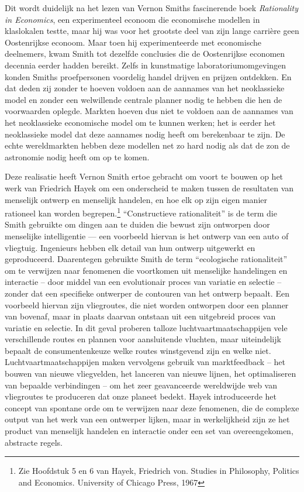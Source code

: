 Dit wordt duidelijk na het lezen van Vernon Smith\textquotesingle s fascinerende boek \emph{Rationality in Economics}, een experimenteel econoom die economische modellen in klaslokalen testte, maar hij was voor het grootste deel van zijn lange carrière geen Oostenrijkse econoom.\autocite{192} Maar toen hij experimenteerde met economische deelnemers, kwam Smith tot dezelfde conclusies die de Oostenrijkse economen decennia eerder hadden bereikt. Zelfs in kunstmatige laboratoriumomgevingen konden Smith\textquotesingle s proefpersonen voordelig handel drijven en prijzen ontdekken. En dat deden zij zonder te hoeven voldoen aan de aannames van het neoklassieke model en zonder een welwillende centrale planner nodig te hebben die hen de voorwaarden oplegde. Markten hoeven dus niet te voldoen aan de aannames van het neoklassieke economische model om te kunnen werken; het is eerder het neoklassieke model dat deze aannames nodig heeft om berekenbaar te zijn. De echte wereldmarkten hebben deze modellen net zo hard nodig als dat de zon de astronomie nodig heeft om op te komen.

Deze realisatie heeft Vernon Smith ertoe gebracht om voort te bouwen op het werk van Friedrich Hayek om een onderscheid te maken tussen de resultaten van menselijk ontwerp en menselijk handelen, en hoe elk op zijn eigen manier rationeel kan worden begrepen.\footnote{Zie Hoofdstuk 5 en 6 van Hayek, Friedrich von. Studies in Philosophy, Politics and Economics. University of Chicago Press, 1967} ``Constructieve rationaliteit'' is de term die Smith gebruikte om dingen aan te duiden die bewust zijn ontworpen door menselijke intelligentie --- een voorbeeld hiervan is het ontwerp van een auto of vliegtuig. Ingenieurs hebben elk detail van hun ontwerp uitgewerkt en geproduceerd. Daarentegen gebruikte Smith de term ``ecologische rationaliteit'' om te verwijzen naar fenomenen die voortkomen uit menselijke handelingen en interactie -- door middel van een evolutionair proces van variatie en selectie -- zonder dat een specifieke ontwerper de contouren van het ontwerp bepaalt. Een voorbeeld hiervan zijn vliegroutes, die niet worden ontworpen door een planner van bovenaf, maar in plaats daarvan ontstaan uit een uitgebreid proces van variatie en selectie. In dit geval proberen talloze luchtvaartmaatschappijen vele verschillende routes en plannen voor aansluitende vluchten, maar uiteindelijk bepaalt de consumentenkeuze welke routes winstgevend zijn en welke niet. Luchtvaartmaatschappijen maken vervolgens gebruik van marktfeedback -- het bouwen van nieuwe vliegvelden, het lanceren van nieuwe lijnen, het optimaliseren van bepaalde verbindingen -- om het zeer geavanceerde wereldwijde web van vliegroutes te produceren dat onze planeet bedekt. Hayek introduceerde het concept van spontane orde om te verwijzen naar deze fenomenen, die de complexe output van het werk van een ontwerper lijken, maar in werkelijkheid zijn ze het product van menselijk handelen en interactie onder een set van overeengekomen, abstracte regels.

